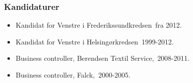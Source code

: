 \documentclass[11pt, a4paper]{awesome-cv}
\begin{document}
\begin{cvletter}
\subsubsection*{Kandidaturer}
\begin{itemize}
\item Kandidat for Venstre i Frederikssundkredsen fra 2012.
\item Kandidat for Venstre i Helsingørkredsen 1999-2012.
\end{itemize}
\begin{itemize}
\item Business controller, Berendsen Textil Service, 2008-2011.
\item Business controller, Falck, 2000-2005.
\end{itemize}
\end{cvletter}
\end{document}
